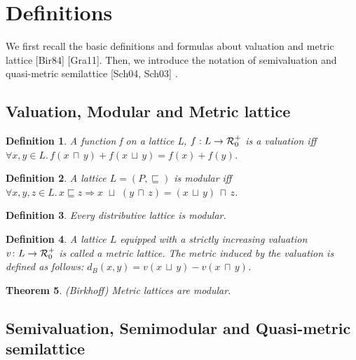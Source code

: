 \documentclass{article}
\newtheorem{theorem}{\bf Theorem}
\newtheorem{definition}[theorem]{\bf Definition}
\begin{document}
\section{Definitions}
We first recall the basic definitions and formulas about valuation and metric lattice [Bir84] [Gra11]. Then, we introduce the notation of semivaluation and  quasi-metric semilattice [Sch04, Sch03] .  

\subsection{Valuation, Modular and Metric lattice}

\begin{definition}
A function f on a lattice L, $f : L \rightarrow \mbox{$\cal{R}$}^{+}_{0}$ is a {\it valuation} iff \\

$\forall x,y \in L. \, f(x \, \sqcap \,  y) + f(x \, \sqcup \,  y) = f(x) + f(y)$. \\
\end{definition}

\begin{definition}
A lattice $L = (P,\sqsubseteq)$ is modular iff $\forall x,y,z \in L. \, x \sqsubseteq z \Rightarrow x \, \, \sqcup \,  \,  (y \, \sqcap \,  z) = (x \, \sqcup \,  y) \, \sqcap \,  z$. \\
\end{definition}

\begin{definition}
Every distributive lattice is modular. \\
\end{definition}
\begin{definition} A lattice $L$ equipped with a strictly increasing valuation $v \colon L \rightarrow \mbox{$\cal{R}$}^{+}_{0}$ is called a metric lattice. The metric induced by the valuation is defined as follows: $d_{B}(x,y) = v(x \, \sqcup \,  y) - v(x \, \sqcap \,  y)$. 
\end{definition}

\begin{theorem} (Birkhoff) \label{birk} Metric lattices are modular. 
\end {theorem} 

\subsection{Semivaluation, Semimodular and Quasi-metric semilattice}
\end{document}
